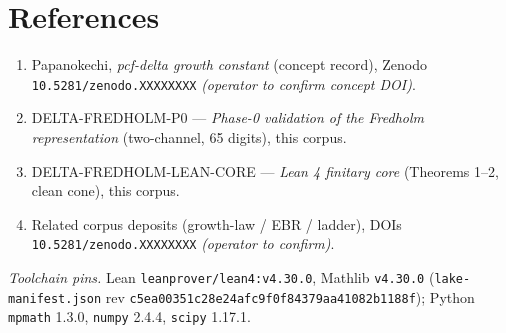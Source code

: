 \documentclass[
]{article}
\providecommand{\tightlist}{%
  \setlength{\itemsep}{0pt}\setlength{\parskip}{0pt}}
\theoremstyle{plain}
\theoremstyle{remark}
\providecommand{\tightlist}{%
  \setlength{\itemsep}{0pt}\setlength{\parskip}{0pt}}
\begin{document}
\section*{References}\label{references}

\begin{enumerate}
\def\labelenumi{\arabic{enumi}.}
\tightlist
\item
  Papanokechi, \emph{pcf-delta growth constant} (concept record), Zenodo
  \texttt{10.5281/zenodo.XXXXXXXX} \emph{(operator to confirm concept
  DOI)}.
\item
  DELTA-FREDHOLM-P0 --- \emph{Phase-0 validation of the Fredholm
  representation} (two-channel, 65 digits), this corpus.
\item
  DELTA-FREDHOLM-LEAN-CORE --- \emph{Lean 4 finitary core} (Theorems
  1--2, clean cone), this corpus.
\item
  Related corpus deposits (growth-law / EBR / ladder), DOIs
  \texttt{10.5281/zenodo.XXXXXXXX} \emph{(operator to confirm)}.
\end{enumerate}

\emph{Toolchain pins.} Lean \texttt{leanprover/lean4:v4.30.0}, Mathlib
\texttt{v4.30.0} (\texttt{lake-manifest.json} rev
\texttt{c5ea00351c28e24afc9f0f84379aa41082b1188f}); Python
\texttt{mpmath} 1.3.0, \texttt{numpy} 2.4.4, \texttt{scipy} 1.17.1.
\end{document}
